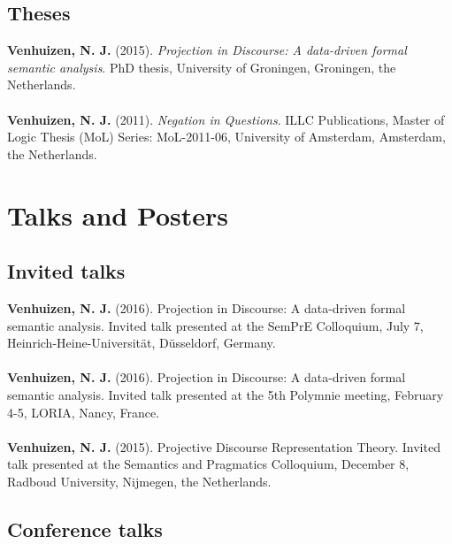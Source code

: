 \documentclass[a4paper,10pt]{article}
\begin{document}
\subsection*{Theses}

\noindent
    \textbf{Venhuizen, N. J.} (2015). \textit{Projection in Discourse:
      A data-driven formal semantic analysis}. PhD thesis, University of
      Groningen, Groningen, the Netherlands.\\
    \\
    \textbf{Venhuizen, N. J.} (2011). \textit{Negation in Questions}.
      ILLC Publications, Master of Logic Thesis (MoL) Series: MoL-2011-06,
      University of Amsterdam, Amsterdam, the Netherlands.


\section*{Talks and Posters}

    
\subsection*{Invited talks}

\noindent
    \textbf{Venhuizen, N. J.} (2016). Projection in Discourse: A data-driven
    formal semantic analysis. Invited talk presented at the SemPrE Colloquium, 
    July 7, Heinrich-Heine-Universit{\"a}t, D{\"u}sseldorf, Germany.\\
    \\
    \textbf{Venhuizen, N. J.} (2016). Projection in Discourse: A data-driven
    formal semantic analysis. Invited talk presented at the 5th Polymnie
    meeting, February 4-5, LORIA, Nancy, France.\\
    \\
    \textbf{Venhuizen, N. J.} (2015). Projective Discourse Representation
    Theory. Invited talk presented at the Semantics and Pragmatics
    Colloquium, December 8, Radboud University, Nijmegen, the Netherlands.

\subsection*{Conference talks}
\end{document}
